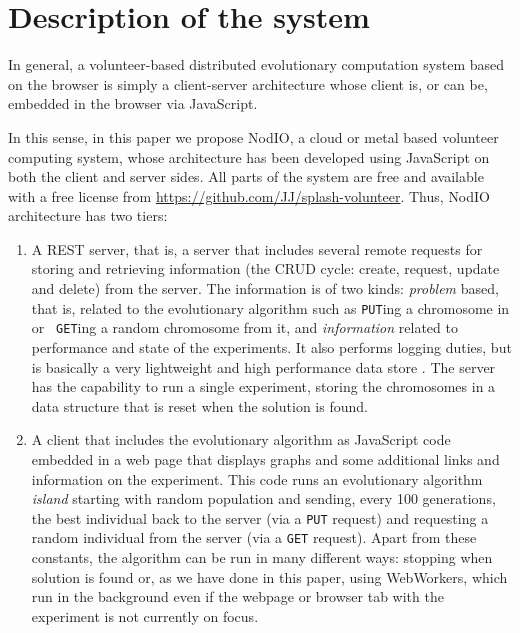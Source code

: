 \documentclass[journal,onecolumn]{IEEEtran}
\begin{document}
\section{Description of the system}
\label{sec:description}

In general, a volunteer-based distributed evolutionary computation
system based on the browser is simply a client-server architecture
whose client is, or can be, embedded in the browser via JavaScript.

In this sense, in this paper we propose {\sf NodIO}, a cloud or metal based
volunteer computing system, whose architecture
has been developed using JavaScript on both the client and server sides.
All parts of the system are free and available with a free
license from \url{https://github.com/JJ/splash-volunteer}.
Thus, {\sf NodIO} architecture has two tiers:\begin{enumerate}
\item A REST server, that is, a server that includes several remote %
  requests for storing and retrieving information (the CRUD cycle:
  create, request, update and delete) from the server. The information
  is of two kinds: {\em problem} based, that is, related to the
  evolutionary algorithm such as {\tt PUT}ing a chromosome in or {\tt
    GET}ing a random chromosome from it, and {\em information} related
  to performance and state of the experiments. It also performs logging
  duties, but is basically a very lightweight and high performance
  data store \cite{jj:idc:lowcost}.
  The server has the capability to
  run a single experiment, storing the chromosomes in a data structure
  that is reset when the solution is found.
\item A client that includes the evolutionary algorithm as
  JavaScript code embedded in a web page that displays graphs and some
  additional links and information on the experiment. This code runs
  an evolutionary algorithm {\em island} starting with random
  population and sending, every 100 generations, the best individual
  back to the server (via a {\tt PUT} request) and requesting a random
  individual from the server (via a {\tt GET} request). Apart from
  these constants, the algorithm can be run in many different ways:
  stopping when solution is found or, as we have done in this paper,
  using WebWorkers, which run in the background even if the webpage or
  browser tab with the experiment is not currently on focus.
\end{enumerate}
\end{document}

